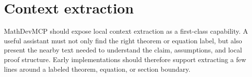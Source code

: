 \section{Context extraction}

MathDevMCP should expose local context extraction as a first-class capability. A useful assistant must not only find the right theorem or equation label, but also present the nearby text needed to understand the claim, assumptions, and local proof structure. Early implementations should therefore support extracting a few lines around a labeled theorem, equation, or section boundary.
